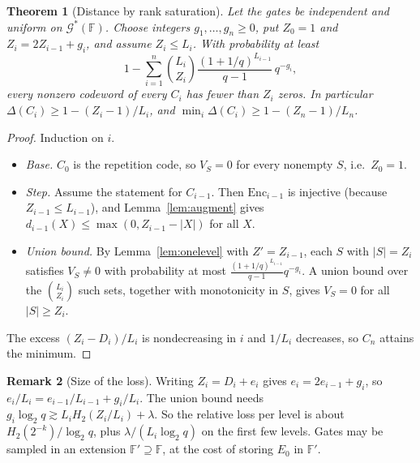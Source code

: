 \documentclass[11pt]{article}
\newtheorem{theorem}{Theorem}[section]
\theoremstyle{definition}
\newtheorem{remark}[theorem]{Remark}
\newcommand{\F}{\mathbb{F}}
\newcommand{\Enc}{\mathrm{Enc}}
\newcommand{\Gs}{\mathcal{G}^{*}}
\begin{document}
\begin{theorem}[Distance by rank saturation]\label{thm:distance2}
Let the gates be independent and uniform on $\Gs(\F)$. Choose integers $g_1,\dots,g_n\ge0$, put
$Z_0=1$ and $Z_i=2Z_{i-1}+g_i$, and assume $Z_i\le L_i$. With probability at least
\[
1-\sum_{i=1}^{n}\binom{L_i}{Z_i}\frac{(1+1/q)^{L_{i-1}}}{q-1}\,q^{-g_i},
\]
every nonzero codeword of every $C_i$ has fewer than $Z_i$ zeros. In particular
$\Delta(C_i)\ge1-(Z_i-1)/L_i$, and $\min_i\Delta(C_i)\ge1-(Z_n-1)/L_n$.
\end{theorem}
\begin{proof}
Induction on $i$.
\begin{itemize}[leftmargin=*]
\item \emph{Base.} $C_0$ is the repetition code, so $V_S=0$ for every nonempty $S$, i.e.\ $Z_0=1$.
\item \emph{Step.} Assume the statement for $C_{i-1}$. Then $\Enc_{i-1}$ is injective (because
$Z_{i-1}\le L_{i-1}$), and Lemma~\ref{lem:augment} gives $d_{i-1}(X)\le\max(0,Z_{i-1}-|X|)$ for all $X$.
\item \emph{Union bound.} By Lemma~\ref{lem:onelevel} with $Z'=Z_{i-1}$, each $S$ with $|S|=Z_i$
satisfies $V_S\neq0$ with probability at most $\frac{(1+1/q)^{L_{i-1}}}{q-1}q^{-g_i}$. A union bound
over the $\binom{L_i}{Z_i}$ such sets, together with monotonicity in $S$, gives $V_S=0$ for all
$|S|\ge Z_i$.
\end{itemize}
The excess $(Z_i-D_i)/L_i$ is nondecreasing in $i$ and $1/L_i$ decreases, so $C_n$ attains the
minimum.
\end{proof}

\begin{remark}[Size of the loss]
Writing $Z_i=D_i+e_i$ gives $e_i=2e_{i-1}+g_i$, so $e_i/L_i=e_{i-1}/L_{i-1}+g_i/L_i$. The union bound
needs $g_i\log_2q\gtrsim L_iH_2(Z_i/L_i)+\lambda$. So the relative loss per level is about
$H_2(2^{-k})/\log_2q$, plus $\lambda/(L_i\log_2q)$ on the first few levels. Gates may be sampled in an
extension $\F'\supseteq\F$, at the cost of storing $E_0$ in $\F'$.
\end{remark}
\end{document}
